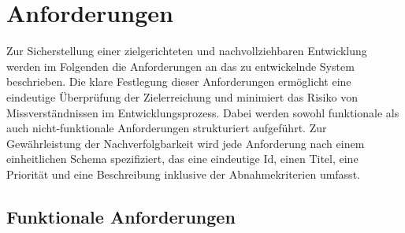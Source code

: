 \chapter{Anforderungen}\label{ch:anforderungen}

Zur Sicherstellung einer zielgerichteten und nachvollziehbaren Entwicklung werden im Folgenden die Anforderungen an das zu entwickelnde System beschrieben.
Die klare Festlegung dieser Anforderungen ermöglicht eine eindeutige Überprüfung der Zielerreichung und minimiert das Risiko von Missverständnissen im Entwicklungsprozess.
Dabei werden sowohl funktionale als auch nicht-funktionale Anforderungen strukturiert aufgeführt.
Zur Gewährleistung der Nachverfolgbarkeit wird jede Anforderung nach einem einheitlichen Schema spezifiziert, das eine eindeutige Id, einen Titel, eine Priorität und eine Beschreibung inklusive der Abnahmekriterien umfasst.



\section{Funktionale Anforderungen}\label{sec:funktionale-anforderungen}

